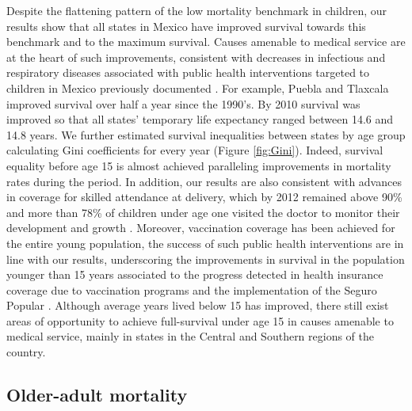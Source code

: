 \documentclass{bmcart}
\begin{document}
Despite the flattening pattern of the low mortality benchmark in children, our results show that all states in Mexico have improved survival towards this benchmark and to the maximum survival. Causes amenable to medical service are at the heart of such improvements, consistent with decreases in infectious and respiratory diseases associated with public health interventions targeted to children in Mexico previously documented \cite{sepulveda2006}. For example, Puebla and Tlaxcala improved survival over half a year since the 1990's. By 2010 survival was improved so that all states' temporary life expectancy ranged between 14.6 and 14.8 years. We further estimated survival inequalities between states by age group calculating Gini coefficients for every year (Figure \ref{fig:Gini}).  Indeed, survival equality before age 15 is almost achieved paralleling improvements in mortality rates during the period. In addition, our results are also consistent with advances in coverage for skilled attendance at delivery, which by 2012 remained above 90\% and more than 78\% of children under age one visited the doctor to monitor their development and growth  \cite{urquieta2015evolution}. Moreover, vaccination coverage has been achieved for the entire young population, the success of such public health interventions are in line with our results, underscoring the improvements in survival in the population younger than 15 years associated to the progress detected in health insurance coverage due to vaccination programs and the implementation of the Seguro Popular \cite{urquieta2015evolution}. Although average years lived below 15 has improved, there still exist areas of opportunity to achieve full-survival under age 15 in causes amenable to medical service, mainly in states in the Central and Southern regions of the country. 


\subsection*{Older-adult mortality}
\end{document}
